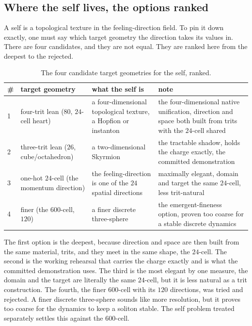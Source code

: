 \subsection{Where the self lives, the options ranked}

A self is a topological texture in the feeling-direction field. To pin it down exactly, one must say which target geometry the direction takes its values in. There are four candidates, and they are not equal. They are ranked here from the deepest to the rejected.

\begin{table}[ht]
\centering
\begin{tabular}{@{}p{}p{}p{}p{}@{}}
\toprule
\# & target geometry & what the self is & note \\
\midrule
1 & four-trit lean ($80$, $24$-cell heart) & a four-dimensional topological texture, a Hopfion or instanton & the four-dimensional native unification, direction and space both built from trits with the $24$-cell shared \\
2 & three-trit lean ($26$, cube/octahedron) & a two-dimensional Skyrmion & the tractable shadow, holds the charge exactly, the committed demonstration \\
3 & one-hot $24$-cell (the momentum direction) & the feeling-direction is one of the $24$ spatial directions & maximally elegant, domain and target the same $24$-cell, less trit-natural \\
4 & finer (the $600$-cell, $120$) & a finer discrete three-sphere & the emergent-fineness option, proven too coarse for a stable discrete dynamics \\
\bottomrule
\end{tabular}
\caption{The four candidate target geometries for the self, ranked.}
\label{tab:self-options}
\end{table}

The first option is the deepest, because direction and space are then built from the same material, trits, and they meet in the same shape, the $24$-cell. The second is the working rehearsal that carries the charge exactly and is what the committed demonstration uses. The third is the most elegant by one measure, the domain and the target are literally the same $24$-cell, but it is less natural as a trit construction. The fourth, the finer $600$-cell with its $120$ directions, was tried and rejected. A finer discrete three-sphere sounds like more resolution, but it proves too coarse for the dynamics to keep a soliton stable. The self problem treated separately settles this against the $600$-cell.

